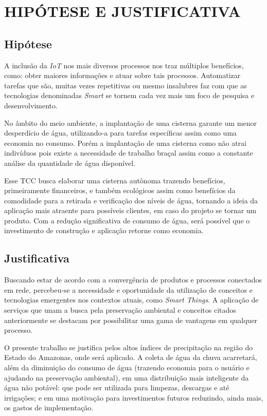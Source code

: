 
\chapter{HIPÓTESE E JUSTIFICATIVA}
\label{chap:hipoteseejustificativa}

\section{Hipótese}
\label{sec:hipotese}

A inclusão da \textit{IoT} nos mais diversos processos nos traz múltiplos benefícios, como: obter maiores informações e atuar sobre tais processos. Automatizar tarefas que são, muitas vezes repetitivas ou mesmo insalubres faz com que as tecnologias denominadas \textit{Smart} se tornem cada vez mais um foco de pesquisa e desenvolvimento. 

No âmbito do meio ambiente, a implantação de uma cisterna garante um menor desperdício de água, utilizando-a para tarefas específicas assim como uma economia no consumo. Porém a implantação de uma cisterna como não atrai indivíduos pois existe a necessidade de trabalho braçal assim como a constante análise da quantidade de água disponível.

Esse TCC busca elaborar uma cisterna autônoma trazendo benefícios, primeiramente financeiros,  e também ecológicos assim como benefícios da comodidade para a retirada e verificação dos níveis de água, tornando a ideia da aplicação mais atraente para possíveis clientes, em caso do projeto se tornar um produto. Com a redução significativa de consumo de água, será possível que o investimento de construção e aplicação retorne como economia.

\section{Justificativa}
\label{sec:justificativa}

Buscando estar de acordo com a convergência de produtos e processos conectados em rede, percebeu-se a necessidade e oportunidade da utilização de conceitos e tecnologias emergentes nos contextos atuais, como \textit{Smart Things}. A aplicação de serviços que unam a busca pela preservação ambiental e conceitos citados anteriormente se destacam por possibilitar uma gama de vantagens em qualquer processo.

O presente trabalho se justifica pelos altos índices de precipitação na região do Estado do Amazonas, onde será aplicado. A coleta de água da chuva acarretará, além da diminuição do consumo de água (trazendo economia para o usuário e ajudando na preservação ambiental), em uma distribuição mais inteligente da água não potável: que pode ser utilizada para limpezas, descargas e até irrigações; e em uma motivação para investimentos futuros reduzindo, ainda mais, os gastos de implementação.

